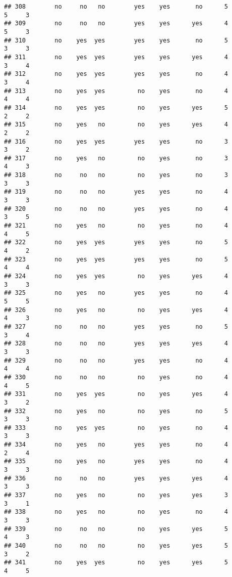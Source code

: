 \documentclass[]{article}
\begin{document}
\begin{verbatim}
## 308        no     no   no        yes    yes       no      5        5     3
## 309        no     no   no        yes    yes      yes      4        5     3
## 310        no    yes  yes        yes    yes       no      5        3     3
## 311        no    yes  yes        yes    yes      yes      4        3     4
## 312        no    yes  yes        yes    yes       no      4        3     4
## 313        no    yes  yes         no    yes       no      4        4     4
## 314        no    yes  yes         no    yes      yes      5        2     2
## 315        no    yes   no         no    yes      yes      4        2     2
## 316        no    yes  yes        yes    yes       no      3        3     2
## 317        no    yes   no         no    yes       no      3        4     3
## 318        no     no   no         no    yes       no      3        3     3
## 319        no     no   no        yes    yes       no      4        3     3
## 320        no     no   no        yes    yes       no      4        3     5
## 321        no    yes   no         no    yes       no      4        4     5
## 322        no    yes  yes        yes    yes       no      5        4     2
## 323        no    yes  yes        yes    yes       no      5        4     4
## 324        no    yes  yes         no    yes      yes      4        3     3
## 325        no    yes   no        yes    yes       no      4        5     5
## 326        no    yes   no         no    yes      yes      4        4     3
## 327        no     no   no        yes    yes       no      5        3     4
## 328        no     no   no        yes    yes      yes      4        3     3
## 329        no     no   no        yes    yes       no      4        4     4
## 330        no     no   no         no    yes       no      4        4     5
## 331        no    yes  yes         no    yes      yes      4        3     2
## 332        no    yes   no         no    yes       no      5        3     3
## 333        no    yes  yes         no    yes       no      4        3     3
## 334        no    yes   no        yes    yes       no      4        2     4
## 335        no    yes   no        yes    yes       no      4        3     3
## 336        no     no   no        yes    yes      yes      4        3     3
## 337        no    yes   no         no    yes      yes      3        3     1
## 338        no    yes   no         no    yes       no      4        3     3
## 339        no     no   no         no    yes      yes      5        4     3
## 340        no     no   no         no    yes      yes      5        3     2
## 341        no    yes  yes         no    yes      yes      5        4     5

\end{verbatim}
\end{document}

